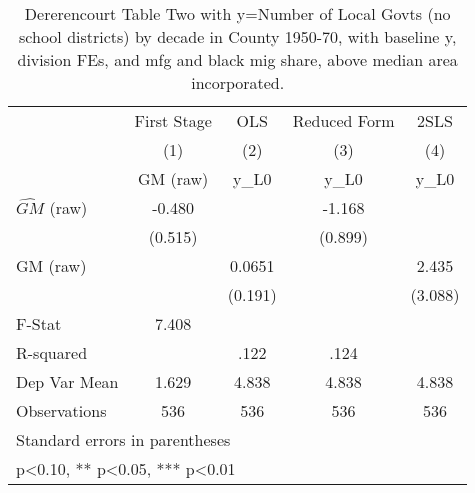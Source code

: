 \begin{table}[htbp]\centering
\def\sym#1{\ifmmode^{#1}\else\(^{#1}\)\fi}
\caption{Dererencourt Table Two with y=Number of Local Govts (no school districts) by decade in County 1950-70, with baseline y, division FEs, and mfg and black mig share, above median area incorporated.}
\begin{tabular}{l*{4}{c}}
\toprule
                    & First Stage   &         OLS   &Reduced Form   &        2SLS   \\
                    &\multicolumn{1}{c}{(1)}&\multicolumn{1}{c}{(2)}&\multicolumn{1}{c}{(3)}&\multicolumn{1}{c}{(4)}\\
                    &\multicolumn{1}{c}{GM  (raw)}&\multicolumn{1}{c}{y\_L0}&\multicolumn{1}{c}{y\_L0}&\multicolumn{1}{c}{y\_L0}\\
\midrule
$\hat{GM}$ (raw)    &      -0.480   &               &      -1.168   &               \\
                    &     (0.515)   &               &     (0.899)   &               \\
\addlinespace
GM  (raw)           &               &      0.0651   &               &       2.435   \\
                    &               &     (0.191)   &               &     (3.088)   \\
\midrule
F-Stat              &       7.408   &               &               &               \\
R-squared           &               &        .122   &        .124   &               \\
Dep Var Mean        &       1.629   &       4.838   &       4.838   &       4.838   \\
Observations        &         536   &         536   &         536   &         536   \\
\bottomrule
\multicolumn{5}{l}{\footnotesize Standard errors in parentheses}\\
\multicolumn{5}{l}{\footnotesize * p<0.10, ** p<0.05, *** p<0.01}\\
\end{tabular}
\end{table}
